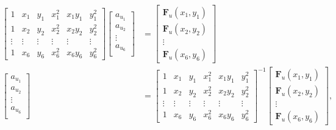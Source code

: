 \begin{align*}
        \begin{bmatrix}
            1 & x_1 & y_1 & x_{1}^2 & x_{1}y_{1} & y_{1}^2\\
            1 & x_2 & y_2 & x_{2}^2 & x_{2}y_{2} & y_{2}^2\\
            \vdots & \vdots & \vdots & \vdots & \vdots & \vdots \\
            1 & x_{6} & y_{6} & x_{6}^2 & x_{6}y_{6} & y_{6}^2
        \end{bmatrix}
        \begin{bmatrix}
            a_{u_1}\\
            a_{u_2}\\
            \vdots \\
            a_{u_6}\\
        \end{bmatrix} &= 
        \begin{bmatrix}
            \mathbf{F}_{u}(x_1,y_1) \\
            \mathbf{F}_{u}(x_2,y_2) \\
            \vdots \\
            \mathbf{F}_{u}(x_6,y_6)
        \end{bmatrix}\\
        \begin{bmatrix}
            a_{u_1}\\
            a_{u_2}\\
            \vdots \\
            a_{u_6}\\
        \end{bmatrix} &=
        \begin{bmatrix}
            1 & x_1 & y_1 & x_{1}^2 & x_{1}y_{1} & y_{1}^2\\
            1 & x_2 & y_2 & x_{2}^2 & x_{2}y_{2} & y_{2}^2\\
            \vdots & \vdots & \vdots & \vdots & \vdots & \vdots \\
            1 & x_{6} & y_{6} & x_{6}^2 & x_{6}y_{6} & y_{6}^2
        \end{bmatrix}^{-1}
        \begin{bmatrix}
            \mathbf{F}_{u}(x_1,y_1) \\
            \mathbf{F}_{u}(x_2,y_2) \\
            \vdots \\
            \mathbf{F}_{u}(x_6,y_6)
        \end{bmatrix},
\end{align*}
